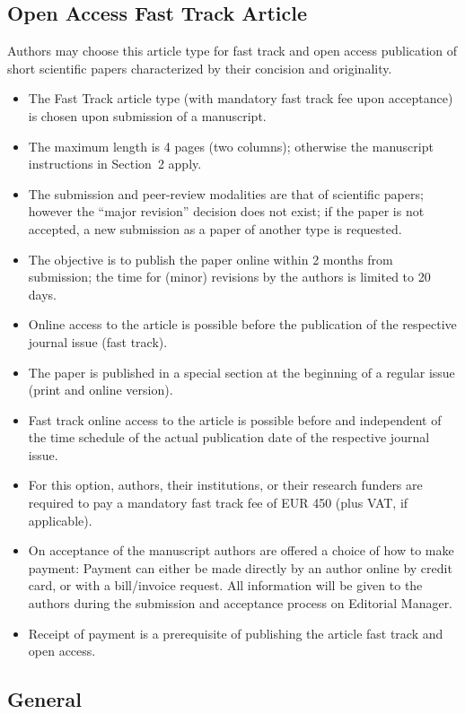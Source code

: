 \documentclass[twocolumn]{article}
\begin{document}
\subsection{Open Access Fast Track Article}

Authors may choose this article type for fast track and open access
publication of short scientific papers characterized by their concision
and originality.
\begin{itemize}
\item  The Fast Track article type (with mandatory fast track fee upon
   acceptance) is chosen upon submission of a manuscript.
\item  The maximum length is 4 pages (two columns); otherwise the
   manuscript instructions in Section~2 apply.
\item  The submission and peer-review modalities are that of scientific
   papers; however the ``major revision'' decision does not exist; if the
   paper is not accepted, a new submission as a paper of another type is
   requested.
\item  The objective is to publish the paper online within 2 months from
   submission; the time for (minor) revisions by the authors is limited
   to 20 days.
\item  Online access to the
   article is possible before the publication of the respective journal
   issue (fast track).
\item  The paper is published in a special section at the beginning of a
   regular issue (print and online version).
\item  Fast track online access to the article is possible before and
   independent of the time schedule of the actual publication date of
   the respective journal issue.
\item  For this option, authors, their institutions, or their research
   funders are required to pay a mandatory fast track fee of EUR 450
   (plus VAT, if applicable).
\item  On acceptance of the manuscript authors are offered a choice of
   how to make payment: Payment can either be made directly by an author
   online by credit card, or with a bill/invoice request. All
   information will be given to the authors during the submission and
   acceptance process on Editorial Manager.
\item  Receipt of payment is a prerequisite of publishing the article
   fast track and open access.
\end{itemize}

\subsection{General}
\end{document}
